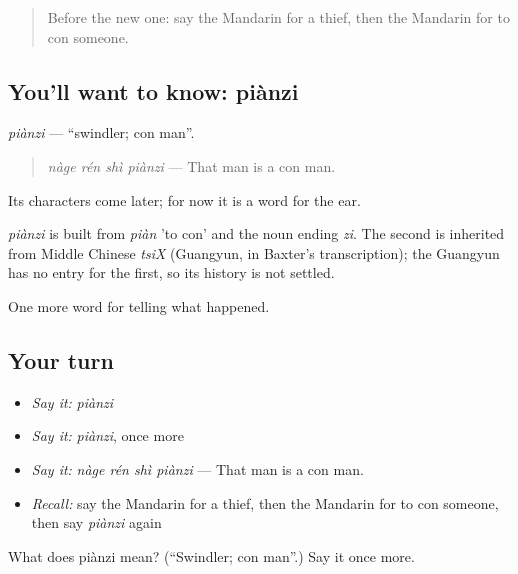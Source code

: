 \label{lesson:ZH-C309-pianzi}



\begin{quote}
Before the new one: say the Mandarin for a thief, then the Mandarin for to con someone.
\end{quote}

\subsection*{You'll want to know: piànzi}
\emph{piànzi} — \textquotedblleft{}swindler; con man\textquotedblright{}.

\begin{quote}
\emph{nàge rén shì piànzi} — That man is a con man.
\end{quote}

Its characters come later; for now it is a word for the ear.

\begin{cousinweb}
\emph{piànzi} is built from \emph{piàn} 'to con' and the noun ending \emph{zi}. The second is inherited from Middle Chinese \emph{tsiX} (Guangyun, in Baxter's transcription); the Guangyun has no entry for the first, so its history is not settled.
\end{cousinweb}

\begin{grammarlens}[title={What you've built}]
One more word for telling what happened.
\end{grammarlens}

\subsection*{Your turn}
\begin{itemize}
\raggedright
  \item \emph{Say it:} \emph{piànzi}
  \item \emph{Say it:} \emph{piànzi}, once more
  \item \emph{Say it:} \emph{nàge rén shì piànzi} — That man is a con man.
  \item \emph{Recall:} say the Mandarin for a thief, then the Mandarin for to con someone, then say \emph{piànzi} again
\end{itemize}

\begin{tcolorbox}[breakable,colback=teal!4,colframe=teal!35!black,title={Before you move on}]
What does piànzi mean? (\textquotedblleft{}Swindler; con man\textquotedblright{}.) Say it once more.
\end{tcolorbox}
